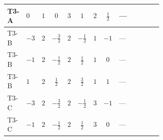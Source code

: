 \documentclass[8pt]{article}
\begin{document}
\begin{landscape}
\begin{longtable}{@{}llcccccc >{\raggedright\arraybackslash}p{0.21\linewidth} >{\raggedright\arraybackslash}p{0.21\linewidth} >{\raggedright\arraybackslash}p{0.21\linewidth}@{}}
\midrule
T3-A & $0$ & $1$ & $0$ & $3$ & $1$ & $2$ & $\frac{1}{2}$ & --- & \scriptsize\adjustbox{max width=\linewidth}{$\begin{gathered} +6 {\lambda_{12}^{(1)}}^2\end{gathered}$} & \scriptsize\adjustbox{max width=\linewidth}{$\begin{gathered} +4 {\lambda_{HS_1}^{(1)}}^2\end{gathered}$} \\
\midrule
T3-B & $-3$ & $2$ & $-\frac{3}{2}$ & $2$ & $-\frac{1}{2}$ & $1$ & $-1$ & --- & \scriptsize\adjustbox{max width=\linewidth}{$\begin{gathered} +4 {\lambda_{12}^{(1)}}^2\end{gathered}$} & \scriptsize\adjustbox{max width=\linewidth}{$\begin{gathered} +4 {\lambda_{HS_1}^{(1)}}^2\end{gathered}$} \\
\midrule
T3-B & $-1$ & $2$ & $-\frac{1}{2}$ & $2$ & $\frac{1}{2}$ & $1$ & $0$ & --- & \scriptsize\adjustbox{max width=\linewidth}{$\begin{gathered} +4 {\lambda_{12}^{(1)}}^2\end{gathered}$} & \scriptsize\adjustbox{max width=\linewidth}{$\begin{gathered} +4 {\lambda_{HS_1}^{(1)}}^2\end{gathered}$} \\
\midrule
T3-B & $1$ & $2$ & $\frac{1}{2}$ & $2$ & $\frac{3}{2}$ & $1$ & $1$ & --- & \scriptsize\adjustbox{max width=\linewidth}{$\begin{gathered} +4 {\lambda_{12}^{(1)}}^2\end{gathered}$} & \scriptsize\adjustbox{max width=\linewidth}{$\begin{gathered} +4 {\lambda_{HS_1}^{(1)}}^2\end{gathered}$} \\
\midrule
T3-C & $-3$ & $2$ & $-\frac{3}{2}$ & $2$ & $-\frac{1}{2}$ & $3$ & $-1$ & --- & \scriptsize\adjustbox{max width=\linewidth}{$\begin{gathered} +4 {\lambda_{12}^{(1)}}^2\end{gathered}$} & \scriptsize\adjustbox{max width=\linewidth}{$\begin{gathered} +4 {\lambda_{HS_1}^{(1)}}^2\end{gathered}$} \\
\midrule
T3-C & $-1$ & $2$ & $-\frac{1}{2}$ & $2$ & $\frac{1}{2}$ & $3$ & $0$ & --- & \scriptsize\adjustbox{max width=\linewidth}{$\begin{gathered} +4 {\lambda_{12}^{(1)}}^2\end{gathered}$} & \scriptsize\adjustbox{max width=\linewidth}{$\begin{gathered} +4 {\lambda_{HS_1}^{(1)}}^2\end{gathered}$} \\

\end{longtable}
\end{landscape}
\end{document}
